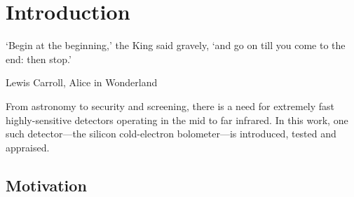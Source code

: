 \chapter{Introduction}
\label{cha:introduction}

\epigraph{`Begin at the beginning,' the King said gravely, `and go on till you come to the end: then stop.'}{{\epiauthor Lewis Carroll}, Alice in Wonderland}

From astronomy to security and screening, there is a need for extremely fast highly-sensitive detectors operating in the mid to far infrared. In this work, one such detector---the silicon cold-electron bolometer---is introduced, tested and appraised.

\section{Motivation}\label{sec:motivation}
